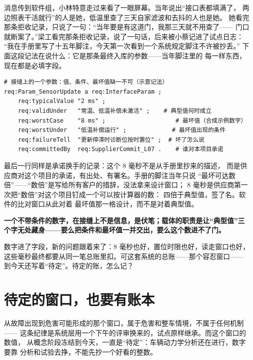 消息传到软件组，小林特意走过来看了一眼屏幕。当年说出“接口表都填满了，
两边照表干活就行”的人是她，低温里查了三天自家滤波和去抖的人也是她。
她看完那条拒收记录，只说了一句：“当年要是有这道门，我那三天就不用查了——
门口就断案了。”梁工看完那条拒收记录，说了一句话，后来被小蔡记进了试点日志：
“我在手册里写了十五年脚注，今天第一次看到一个系统规定脚注不许被抄丢。”
下面这段记法在说什么：它是那条最终入库的参数——当年脚注里的
每一样东西，现在都是必填字段。

\nopagebreak[4]
\begin{codebox}
\begin{Verbatim}[fontsize=\small,breaklines=true,breakanywhere=true,breaksymbolleft={},breaksymbolright={}]
# 接缝上的一个参数：值、条件、最坏值缺一不可（示意记法）
req:Param_SensorUpdate a req:InterfaceParam ;
    req:typicalValue "2 ms" ;
    req:validUnder   "常温、低温补偿未激活" ;    # 典型值何时成立
    req:worstCase    "8 ms" ;                    # 最坏值（合成示例数字）
    req:worstUnder   "低温补偿运行" ;             # 最坏值出现的条件
    req:failureTell  "更新停滞时诊断位按时置位" ;  # 坏了怎么说
    req:committedBy  req:SupplierCommit_L07 .    # 谁对本项目承诺
\end{Verbatim}
\end{codebox}

最后一行同样是承诺换手的记录：这个 8 毫秒不是从手册里抄来的描述，
而是供应商对这个项目的承诺，有出处、有署名。手册的脚注当年只说
“最坏可达数倍”——“数倍”是写给所有客户的措辞，没法拿来设计窗口；
8 毫秒是供应商第一次把“数倍”对这个项目钉成一个可以按计算器的数：
四倍于典型值，签了名。软件的比对窗口从此对着
最坏值那一格设计，而不是对着典型值。

\textbf{一个不带条件的数字，在接缝上不是信息，是伏笔；载体的职责是让“典型值”三个字无处藏身——要么把条件和最坏值一并交出，要么这个数进不了门。}

数字进了字段，新的问题跟着来了：8 毫秒也好，置位时限也好，读走窗口也好，
这些毫秒最终都要从同一笔总账里扣。可这套系统的总账——那个容忍窗口——
到今天还写着“待定”。待定的账，怎么记？

\section{待定的窗口，也要有账本}

从故障出现到危害可能形成的那个窗口，属于危害和整车情境，不属于任何机制——
这条纪律是系统层用一个下午的评审换来的，试点原样继承。而这个窗口的数值，
从概念阶段冻结到今天，一直是“待定”：车辆动力学分析还在进行，数字要靠
分析和试验去挣，不能先抄一个好看的整数。

